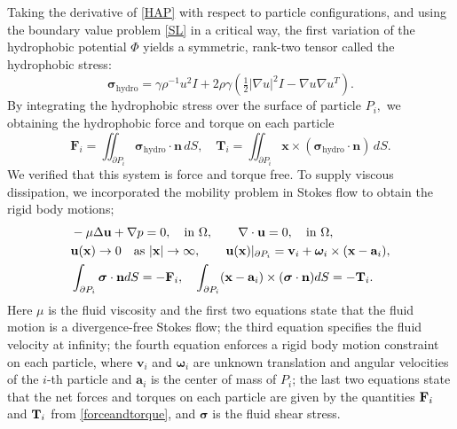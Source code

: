 Taking the derivative of \eqref{HAP} with respect to particle configurations, and using the boundary value problem \eqref{SL}
in a critical way,
the first variation of the hydrophobic potential $\Phi$  
yields a symmetric, rank-two tensor \cite{Bandle2015,Schiffer1954,Grinfeld2010} called the hydrophobic stress:
\begin{equation}
  \label{stress}
\boldsymbol{\sigma}_{\text{hydro}} = \gamma \rho^{-1} u^2 I + 2\rho \gamma (\tfrac{1}{2}|\nabla u|^2I - \nabla u \nabla u^T).
\end{equation}
%
%
By integrating the hydrophobic stress over the surface of particle $P_i,$ we obtaining the hydrophobic force and torque on each particle 
\begin{equation}
  \label{forceandtorque}
  \mathbf{F}_i = \iint_{\partial P_i} \boldsymbol{\sigma}_{\text{hydro}} \cdot \mathbf{n} \,dS,\quad
  \mathbf{T}_i = \iint_{\partial P_i} \mathbf{x} \times (\boldsymbol{\sigma}_{\text{hydro}} \cdot \mathbf{n}) \,dS.
\end{equation}
We verified that this system is force and torque free.
To supply viscous dissipation, 
we incorporated the mobility problem in Stokes flow to obtain the rigid body motions; 
\begin{equation}
\label{eq:stokes}
\begin{aligned}
&-\mu \Delta {\bf u} + \nabla p = 0, \quad \text{in}\ \Omega, \qquad 
\nabla \cdot {\bf u} = 0,  \quad \text{in}\ \Omega,\\
&{\bf u}({\bf x}) \to 0 \quad \text{as}\ |{\bf x}|\to \infty,\qquad 
  \mathbf{u}(\mathbf{x})|_{\partial P_i} = \mathbf{v}_i +
\boldsymbol{\omega}_i\times(\mathbf{x} - \mathbf{a}_i),\\
&\int_{\partial P_i}\boldsymbol{\sigma}\cdot {\bf n} dS=-{\bf F}_i, \quad
\int_{\partial P_i}(\mathbf{x}-\mathbf{a}_i)\times (\boldsymbol{\sigma} \cdot \mathbf{n}) dS=-{\bf T}_i.
\end{aligned}
\end{equation}
Here $\mu$ is the fluid viscosity and the first two equations state
that the fluid motion is a
divergence-free Stokes flow; the third equation specifies the fluid
velocity at infinity;
the fourth equation enforces a rigid body motion constraint on each
particle, where
$\mathbf{v}_i$ and $\boldsymbol{\omega}_i$ are unknown translation and
angular velocities
of the $i$-th particle and $\mathbf{a}_i$ is the center of mass of $P_i$;
the last two equations state that the net forces and torques
on each particle are given by the quantities ${\bf F}_i$ and ${\bf T}_i$
from \eqref{forceandtorque}, and $\boldsymbol{\sigma}$ is the fluid shear stress. 

